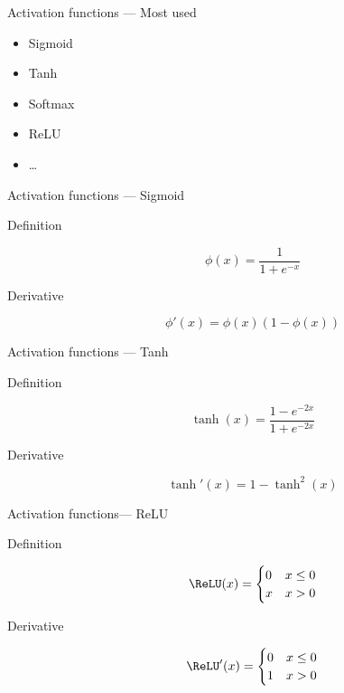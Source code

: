 \begin{frame}{Activation functions --- Most used}
  \begin{itemize}
  \item Sigmoid
  \item Tanh
  \item Softmax
  \item ReLU
  \item …
  \end{itemize}
\end{frame}

\begin{frame}{Activation functions --- Sigmoid}
  \begin{center}
  \end{center}

  \begin{description}
    \item[Definition] \[\phi(x) = \frac{1}{1 + e^{-x}}\]
    \item[Derivative] \[\phi'(x)=\phi(x)(1-\phi(x))\]
  \end{description}
\end{frame}

\begin{frame}{Activation functions --- Tanh}
  \begin{center}
  \end{center}

  \begin{description}
    \item[Definition] \[\tanh(x)=\frac{1-e^{-2x}}{1+e^{-2x}}\]
    \item[Derivative] \[\tanh'(x)=1-\tanh^2(x)\]
  \end{description}
\end{frame}

\begin{frame}{Activation functions--- ReLU}
  \begin{center}
  \end{center}

  \begin{description}
    \item[Definition] \[\ReLU(x)=\begin{cases} 0 & x \leq 0 \\ x & x > 0\end{cases}\]
    \item[Derivative] \[\ReLU'(x)=\begin{cases} 0 & x \leq 0 \\ 1 & x > 0\end{cases}\]
  \end{description}
\end{frame}

